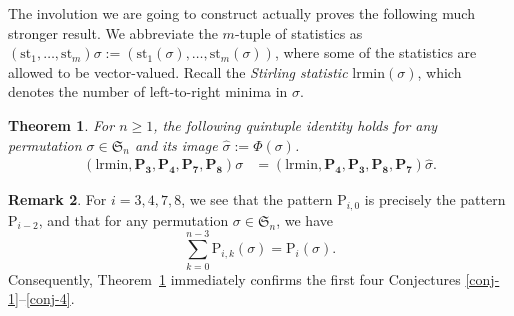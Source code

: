 \documentclass[12pt,reqno]{article}
\numberwithin{equation}{section}
\theoremstyle{plain}
\newtheorem{theorem}{Theorem}[section]
\theoremstyle{definition}
\newtheorem{remark}[theorem]{Remark}
\def\fS{\mathfrak{S}}
\def\rP{\mathrm{P}}
\newcommand\PGI[1]{\mathrm{P}_{i,#1}}
\def\st{\mathrm{st}}
\def\lrmin{\mathrm{lrmin}}
\begin{document}
The involution we are going to construct actually proves the following much stronger result. We abbreviate the $m$-tuple of statistics as $(\st_1,\ldots,\st_m) \sigma:=(\st_1(\sigma),\ldots,\st_m(\sigma))$, where some of the statistics are allowed to be vector-valued. Recall the {\em Stirling statistic} $\lrmin(\sigma)$, which denotes the number of left-to-right minima in $\sigma$.

\begin{theorem}\label{thm:5-tuple}
For $n\ge 1$, the following quintuple identity holds for any permutation $\sigma\in\fS_n$ and its image $\hat{\sigma}:=\Phi(\sigma)$.
\begin{align}
\label{id:5-tuple}
(\lrmin,\mathbf{P_3},\mathbf{P_4},\mathbf{P_7},\mathbf{P_8}) \sigma &=(\lrmin,\mathbf{P_4},\mathbf{P_3},\mathbf{P_8},\mathbf{P_7}) \hat{\sigma}.
\end{align}
\end{theorem}

\begin{remark}
For $i=3,4,7,8$, we see that the pattern $\rP_{i,0}$ is precisely the pattern $\rP_{i-2}$, and that for any permutation $\sigma\in\fS_n$, we have
$$\sum_{k=0}^{n-3}\PGI{k}(\sigma)=\rP_i(\sigma).$$
Consequently, Theorem~\ref{thm:5-tuple} immediately confirms the first four Conjectures \ref{conj-1}--\ref{conj-4}.
\end{remark}
\end{document}
